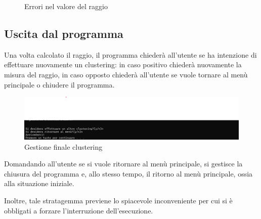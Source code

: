 \begin{figure}[h!]
    \centering
    \hfill
    \caption{Errori nel valore del raggio}
\end{figure}

\subsection*{Uscita dal programma}
Una volta calcolato il raggio, il programma chiederà all'utente se ha intenzione di effettuare nuovamente un clustering: in caso positivo chiederà nuovamente la misura del raggio, in caso opposto chiederà all'utente se vuole tornare al menù principale o chiudere il programma. 


\begin{figure}[h]
    \centering
    \includegraphics[width = .5\textwidth]{images/richeista continuazione.png}
    \caption{Gestione finale clustering}
\end{figure}

Domandando all'utente se si vuole ritornare al menù principale, si gestisce la chiusura del programma e, allo stesso tempo, il ritorno al menù principale, ossia alla situazione iniziale. 

Inoltre, tale stratagemma previene lo spiacevole inconveniente per cui si è obbligati a forzare l'interruzione dell'esecuzione.

